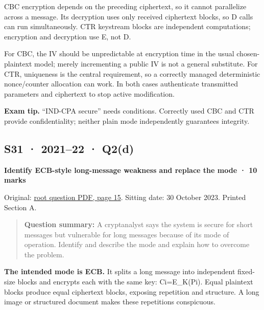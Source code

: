 \documentclass[11pt,a4paper]{article}
\begin{document}
CBC encryption depends on the preceding ciphertext,\allowbreak{} so it cannot parallelize across a message. Its decryption uses only received ciphertext blocks,\allowbreak{} so D calls can run simultaneously. CTR keystream blocks are independent computations; encryption and decryption use E,\allowbreak{} not D.


For CBC,\allowbreak{} the IV should be unpredictable at encryption time in the usual chosen-plaintext model; merely incrementing a public IV is not a general substitute. For CTR,\allowbreak{} uniqueness is the central requirement,\allowbreak{} so a correctly managed deterministic nonce/\allowbreak{}counter allocation can work. In both cases authenticate transmitted parameters and ciphertext to stop active modification.



{\color{ForestGreen}\textbf{Exam tip.} “IND-CPA secure” needs conditions. Correctly used CBC and CTR provide confidentiality; neither plain mode independently guarantees integrity.}




\clearpage
\subsection{S31 · 2021–22 · Q2(d)}\label{s31}

\textbf{Identify ECB-style long-message weakness and replace the mode · 10 marks}


Original: \href{../../CSE405-Security_Merged.pdf\#page=15}{root question PDF,\allowbreak{} page 15}. Sitting date: 30 October 2023. Printed Section A.



\begin{quote}\small

\textbf{Question summary:} A cryptanalyst says the system is secure for short messages but vulnerable for long messages because of its mode of operation. Identify and describe the mode and explain how to overcome the problem.



\end{quote}

\textbf{The intended mode is ECB.} It splits a long message into independent fixed-size blocks and encrypts each with the same key: Ci=\allowbreak{}E\_K(Pi). Equal plaintext blocks produce equal ciphertext blocks,\allowbreak{} exposing repetition and structure. A long image or structured document makes these repetitions conspicuous.
\end{document}
